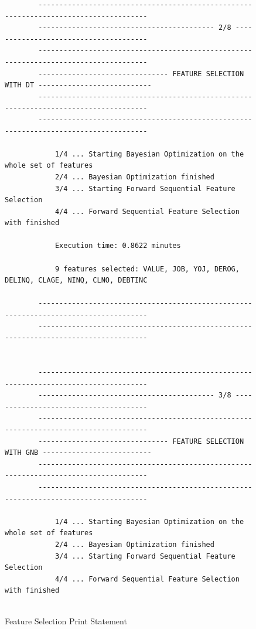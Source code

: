         \begin{figure}[H]
            \centering\caption{Feature Selection Print Statement}
            \label{fig:featselectprint}
        
        {\fontsize{8.8}{11}\selectfont 
        \begin{verbatim}
        -------------------------------------------------------------------------------------
        ------------------------------------------ 2/8 --------------------------------------
        -------------------------------------------------------------------------------------
        ------------------------------- FEATURE SELECTION WITH DT ---------------------------
        -------------------------------------------------------------------------------------
        ------------------------------------------------------------------------------------- 
        
            1/4 ... Starting Bayesian Optimization on the whole set of features
            2/4 ... Bayesian Optimization finished
            3/4 ... Starting Forward Sequential Feature Selection
            4/4 ... Forward Sequential Feature Selection with finished 
            
            Execution time: 0.8622 minutes 
            
            9 features selected: VALUE, JOB, YOJ, DEROG, DELINQ, CLAGE, NINQ, CLNO, DEBTINC 
            
        -------------------------------------------------------------------------------------
        ------------------------------------------------------------------------------------- 
        
            
        -------------------------------------------------------------------------------------
        ------------------------------------------ 3/8 --------------------------------------
        -------------------------------------------------------------------------------------
        ------------------------------- FEATURE SELECTION WITH GNB --------------------------
        -------------------------------------------------------------------------------------
        ------------------------------------------------------------------------------------- 
            
            1/4 ... Starting Bayesian Optimization on the whole set of features
            2/4 ... Bayesian Optimization finished
            3/4 ... Starting Forward Sequential Feature Selection
            4/4 ... Forward Sequential Feature Selection with finished 
            

\end{verbatim}}
\end{figure}
